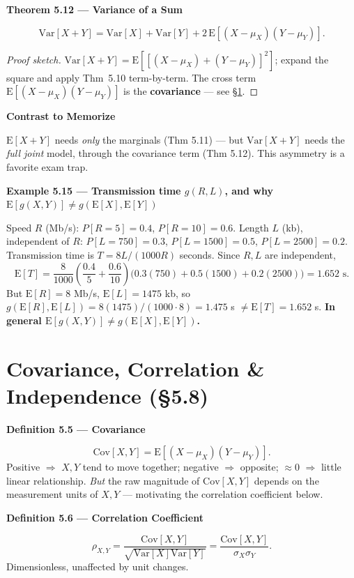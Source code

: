\documentclass[11pt]{article}
\newcommand{\E}[1]{\mathrm{E}\left[#1\right]}
\newcommand{\Var}[1]{\mathrm{Var}\left[#1\right]}
\newcommand{\Cov}[1]{\mathrm{Cov}\left[#1\right]}
\renewcommand{\P}[1]{P\left[#1\right]}
\newcommand{\topline}[1]{\par\vspace{5pt}\noindent{\color{#1}\rule{\linewidth}{1.1pt}}\par\vspace{3pt}}
\newcommand{\botline}[1]{\par\vspace{2pt}\noindent{\color{#1}\rule{\linewidth}{1.1pt}}\par\vspace{8pt}}
\newenvironment{defbox}[2]{%
  \topline{defcol}\noindent\textbf{\color{defcol}Definition #1 --- #2}\par\smallskip\noindent\ignorespaces
}{\botline{defcol}}
\newenvironment{thmbox}[2]{%
  \topline{thmcol}\noindent\textbf{\color{thmcol}Theorem #1 --- #2}\par\smallskip\noindent\ignorespaces
}{\botline{thmcol}}
\newenvironment{exbox}[2]{%
  \topline{exmcol}\noindent\textbf{\color{exmcol}Example #1 --- #2}\par\smallskip\noindent\ignorespaces
}{\botline{exmcol}}
\newenvironment{notebox}[1]{%
  \topline{notecol}\noindent\textbf{\color{notecol}#1}\par\smallskip\noindent\ignorespaces
}{\botline{notecol}}
\begin{document}
\begin{thmbox}{5.12}{Variance of a Sum}
\[ \Var{X+Y} = \Var{X}+\Var{Y}+2\,\E{(X-\mu_X)(Y-\mu_Y)}. \]
\end{thmbox}
\begin{proof}[Proof sketch]
$\Var{X+Y}=\E{[(X-\mu_X)+(Y-\mu_Y)]^2}$; expand the square and apply Thm~5.10 term-by-term.
The cross term $\E{(X-\mu_X)(Y-\mu_Y)}$ is the \textbf{covariance} --- see \S\ref{sec:58}.
\end{proof}

\begin{notebox}{Contrast to Memorize}
$\E{X+Y}$ needs \emph{only} the marginals (Thm 5.11) --- but $\Var{X+Y}$ needs the \emph{full
joint} model, through the covariance term (Thm 5.12). This asymmetry is a favorite exam trap.
\end{notebox}

\begin{exbox}{5.15}{Transmission time $g(R,L)$, and why $\E{g(X,Y)}\ne g(\E{X},\E{Y})$}
Speed $R$ (Mb/s): $\P{R=5}=0.4$, $\P{R=10}=0.6$.
Length $L$ (kb), independent of $R$: $\P{L=750}=0.3$, $\P{L=1500}=0.5$, $\P{L=2500}=0.2$.
Transmission time is $T=8L/(1000R)$ seconds. Since $R,L$ are independent,
\[ \E{T} = \frac{8}{1000}\left(\frac{0.4}{5}+\frac{0.6}{10}\right)\big(0.3(750)+0.5(1500)+0.2(2500)\big) = 1.652\text{ s}. \]
But $\E{R}=8$ Mb/s, $\E{L}=1475$ kb, so $g(\E{R},\E{L})=8(1475)/(1000\cdot8)=1.475$ s
$\ne \E{T}=1.652$ s. \textbf{In general $\E{g(X,Y)}\ne g(\E{X},\E{Y})$.}
\end{exbox}

\clearpage
\section{Covariance, Correlation \& Independence (\S5.8)}
\label{sec:58}

\begin{defbox}{5.5}{Covariance}
\[ \Cov{X,Y} = \E{(X-\mu_X)(Y-\mu_Y)}. \]
Positive $\Rightarrow$ $X,Y$ tend to move together; negative $\Rightarrow$ opposite;
$\approx 0$ $\Rightarrow$ little linear relationship. \emph{But} the raw magnitude of
$\Cov{X,Y}$ depends on the measurement units of $X,Y$ --- motivating the correlation
coefficient below.
\end{defbox}

\begin{defbox}{5.6}{Correlation Coefficient}
\[ \rho_{X,Y} = \frac{\Cov{X,Y}}{\sqrt{\Var{X}\Var{Y}}} = \frac{\Cov{X,Y}}{\sigma_X\sigma_Y}. \]
Dimensionless, unaffected by unit changes.
\end{defbox}
\end{document}
